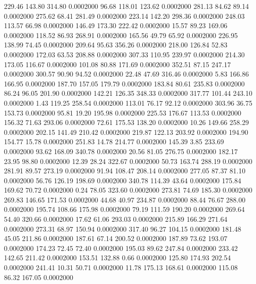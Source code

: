  229.46  143.80  314.80   0.0002000
  96.68  118.01  123.62   0.0002000
 281.13   84.62   89.14   0.0002000
 275.62   68.41  281.49   0.0002000
 223.14  142.20  298.36   0.0002000
 248.03  113.57   66.98   0.0002000
 146.49  173.30  222.42   0.0002000
  15.57   89.23  169.06   0.0002000
 118.52   86.93  268.91   0.0002000
 165.56   49.79   65.92   0.0002000
 226.95  138.99   74.45   0.0002000
 209.64   95.63  356.26   0.0002000
 218.00  126.84   52.83   0.0002000
 172.03   63.53  208.88   0.0002000
 307.33  110.95  239.97   0.0002000
 214.30  173.05  116.67   0.0002000
 101.08   80.88  171.69   0.0002000
 352.51   87.15  247.17   0.0002000
 300.57   90.90   94.52   0.0002000
  22.48   47.69  316.46   0.0002000
   5.83  166.86  166.95   0.0002000
 187.70  157.05  179.79   0.0002000
 183.84   80.61  235.83   0.0002000
  86.24   96.05  201.90   0.0002000
 142.21  126.35  348.33   0.0002000
 317.77  101.44  243.10   0.0002000
   1.43  119.25  258.54   0.0002000
 113.01   76.17   92.12   0.0002000
 303.96   36.75  153.73   0.0002000
  95.81   19.20  195.98   0.0002000
 225.53  176.67  113.53   0.0002000
 156.32   71.63  293.06   0.0002000
  72.61  175.53  138.20   0.0002000
  10.26  149.66  258.29   0.0002000
 202.15  141.49  210.42   0.0002000
 219.87  122.13  203.92   0.0002000
 194.90  154.77   15.78   0.0002000
 251.83   14.78  214.77   0.0002000
 145.39    3.85  233.69   0.0002000
  93.62  168.09  340.78   0.0002000
  20.56   81.05  276.75   0.0002000
 182.17   23.95   98.80   0.0002000
  12.39   28.24  322.67   0.0002000
  50.73  163.74  288.19   0.0002000
 281.91   89.57  273.19   0.0002000
  91.94  108.47  208.14   0.0002000
 277.05   87.37   81.10   0.0002000
  56.76  126.19  198.69   0.0002000
 340.78  114.39   43.64   0.0002000
 175.84  169.62   70.72   0.0002000
   0.24   78.05  323.60   0.0002000
 273.81   74.69  185.30   0.0002000
 269.83  146.65  171.53   0.0002000
  44.68   40.97  234.87   0.0002000
  88.44   76.67  288.00   0.0002000
 195.74  108.66  175.98   0.0002000
  79.19  111.59  190.20   0.0002000
 269.64   54.40  320.66   0.0002000
  17.62   61.06  293.03   0.0002000
 215.89  166.29  271.64   0.0002000
 273.31   68.97  150.94   0.0002000
 317.40   96.27  104.15   0.0002000
 181.48   45.05  211.86   0.0002000
 187.61   67.14  200.52   0.0002000
 187.89   73.62  193.07   0.0002000
 174.23   72.45   72.40   0.0002000
 195.03   89.62  247.84   0.0002000
 233.42  142.65  211.42   0.0002000
 153.51  132.88    0.66   0.0002000
 125.80  174.93  202.54   0.0002000
 241.41   10.31   50.71   0.0002000
  11.78  175.13  168.61   0.0002000
 115.08   86.32  167.05   0.0002000

